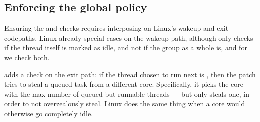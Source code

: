 \subsection{Enforcing the global policy}\label{ss:implementation:exit}

Ensuring the \entry{} and \exit{} checks requires interposing on Linux's wakeup
and exit codepaths. Linux already special-cases on the wakeup path, although
only checks if the thread itself is marked as idle, and not if the group as a
whole is, and for \schedbe{} we check both.

\schedbe{} adds a check on the exit path: if the thread chosen to run next is
\schedbe{}, then the patch tries to steal a queued \schednormal{} task from a
different core. Specifically, it picks the core with the max number of queued
but runnable \schednormal{} threads --- but only steals one, in order to not
overzealously steal. Linux does the same thing when a core would otherwise go
completely idle.